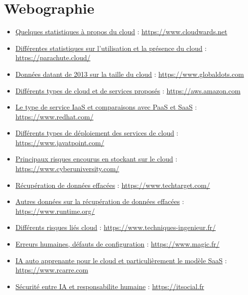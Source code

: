 \documentclass[a4paper, 12pt]{article}
\begin{document}
  \section{Webographie}
    \begin{itemize}
      \item \href{https://www.cloudwards.net/cloud-computing-statistics/}{Quelques statistiques à propos du cloud} : \url{https://www.cloudwards.net}
      \item \href{https://parachute.cloud/cloud-computing-statistics/}{Différentes statistiques sur l'utilisation et la présence du cloud} : \url{https://parachute.cloud/}
      \item \href{https://www.globaldots.com/resources/blog/how-much-is-stored-in-the-cloud/}{Données datant de 2013 sur la taille du cloud} : \url{https://www.globaldots.com}
      \item \href{https://aws.amazon.com/fr/types-of-cloud-computing/}{Différents types de cloud et de services proposés} : \url{https://aws.amazon.com}
      \item \href{https://www.redhat.com/fr/topics/cloud-computing/what-is-iaas}{Le type de service IaaS et comparaisons avec PaaS et SaaS} : \url{https://www.redhat.com/}
      \item \href{https://www.javatpoint.com/cloud-deployment-model}{Différents types de déploiement des services de cloud} : \url{https://www.javatpoint.com/}
      \item \href{https://www.cyberuniversity.com/post/la-securite-dans-le-cloud-principaux-risques-et-challenges}{Principaux risques encourus en stockant sur le cloud} : \url{https://www.cyberuniversity.com/}
      \item \href{https://www.techtarget.com/searchdisasterrecovery/definition/data-recovery}{Récupération de données effacées} : \url{https://www.techtarget.com/}
      \item \href{https://www.runtime.org/recoverability.htm}{Autres données sur la récupération de données effacées} : \url{https://www.runtime.org/}
      \item \href{https://www.techniques-ingenieur.fr/actualite/articles/la-securite-dans-le-cloud-une-approche-fournisseur-basee-sur-les-risques-15550/}{Différents risques liés cloud} : \url{https://www.techniques-ingenieur.fr/}
      \item \href{https://www.magic.fr/cloud-public-les-erreurs-de-configuration-sont-extremement-frequentes/}{Erreurs humaines, défauts de configuration} : \url{https://www.magic.fr/}


      \item \href{https://www.rcarre.com/blog/intelligence-artificielle-auto-apprenante-pour-le-cloud-and-saas/}{IA auto apprenante pour le cloud et particulièrement le modèle SaaS} : \url{https://www.rcarre.com}
      \item \href{https://itsocial.fr/partenaires/oracle-partenaire/tribunes-oracle/securite-du-cloud-entre-intelligence-artificielle-et-responsabilite-humaine/}{Sécurité entre IA et responsabilite humaine} : \url{https://itsocial.fr}

    \end{itemize}
\end{document}

